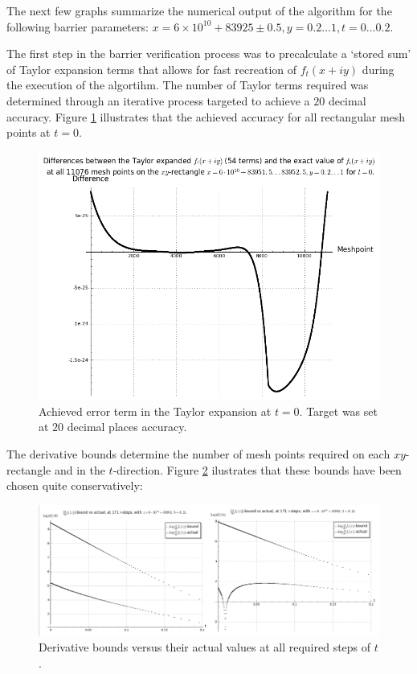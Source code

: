 The next few graphs summarize the numerical output of the algorithm for the following barrier parameters: $x=6\times 10^{10}+83925 \pm 0.5, y = 0.2 \dots 1, t=0 \dots 0.2$.  

The first step in the barrier verification process was to precalculate a `stored sum' of Taylor expansion terms that allows for fast recreation of $f_t(x+iy)$ during the execution of the algortihm. The number of Taylor terms required was determined through an iterative process targeted to achieve a $20$ decimal accuracy.  Figure \ref{fig1} illustrates that the achieved accuracy for all rectangular mesh points at $t=0$.

\begin{figure}[h!]
  \includegraphics[width=0.7\linewidth]{BarrieraccuracyTaylor}
  \caption{Achieved error term in the Taylor expansion at $t=0$. Target was set at $20$ decimal places accuracy.}\label{fig1}
\end{figure}

The derivative bounds determine the number of mesh points required on each $xy$-rectangle and in the $t$-direction. Figure \ref{fig2} ilustrates that these bounds have been chosen quite conservatively:

\begin{figure}[h!]
  \includegraphics[width=1.0\linewidth]{Derivativebounds}
  \caption{Derivative bounds versus their actual values at all required steps of $t$.}\label{fig2}
\end{figure}

